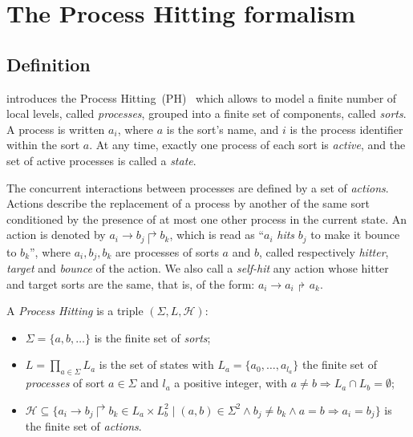 \documentclass{movep}
\def\pref{\prettyref}
\newcommand{\PHs}{\Sigma}
\newcommand{\PHl}{L}
\newcommand{\PHa}{\PHh}
\newcommand{\PHh}{\mathcal{H}}
\newcommand{\PHfrappeA}{\rightarrow}
\newcommand{\PHfrappeB}{\Rsh}
\newcommand{\PHfrappe}[3]{#1\PHfrappeA#2\PHfrappeB#3}
\newcounter{la}
\begin{document}



\section{The Process Hitting formalism}
\label{sec:ph}

\subsection{Definition}

\pref{def:PH} introduces the Process Hitting~(PH)~\cite{PMR10-TCSB}
which allows to model
a finite number of local levels,
called \emph{processes},
grouped into a finite set of components, called \emph{sorts}.
A process is written $a_i$, where $a$ is the sort's name,
and $i$ is the process identifier within the sort $a$.
At any time, exactly one process of each sort is \emph{active},
and the set of active processes is called a \emph{state}.

The concurrent interactions between processes are defined by a set of \emph{actions}.
Actions describe the replacement of a process by another of the same sort
conditioned by the presence of at most one other process in the current state.
An action is denoted by $\PHfrappe{a_i}{b_j}{b_k}$, which is read as
``$a_i$ \emph{hits} $b_j$ to make it bounce to $b_k$'',
where $a_i,b_j,b_k$ are processes of sorts $a$ and $b$,
called respectively \emph{hitter}, \emph{target} and
\emph{bounce} of the action.
We also call a \emph{self-hit} any action whose hitter and target sorts are the same,
that is, of the form: $\PHfrappe{a_i}{a_i}{a_k}$.

\begin{definition}\label{def:PH}
  A \emph{Process Hitting} is a triple $(\PHs,\PHl,\PHa)$:
  \begin{itemize}
    \item $\PHs = \{a,b,\dots\}$ is the finite set of \emph{sorts};
    \item $\PHl = \prod_{a\in\PHs} \PHl_a$ is the set of states with
      $\PHl_a = \{a_0,\dots,a_{l_a}\}$
      the finite set of \emph{processes} of sort $a\in\Sigma$
      and $l_a$ a positive integer, with $a\neq b\Rightarrow \PHl_a \cap \PHl_b = \emptyset$;
    \item $\PHa \subseteq \{ \PHfrappe{a_i}{b_j}{b_k} \in \PHl_a \times \PHl_b^2 \mid
      (a,b) \in \PHs^2 \wedge b_j\neq b_k \wedge a=b\Rightarrow a_i=b_j\}$
      is the finite set of \emph{actions}.
  \end{itemize}
\end{definition}
\end{document}
